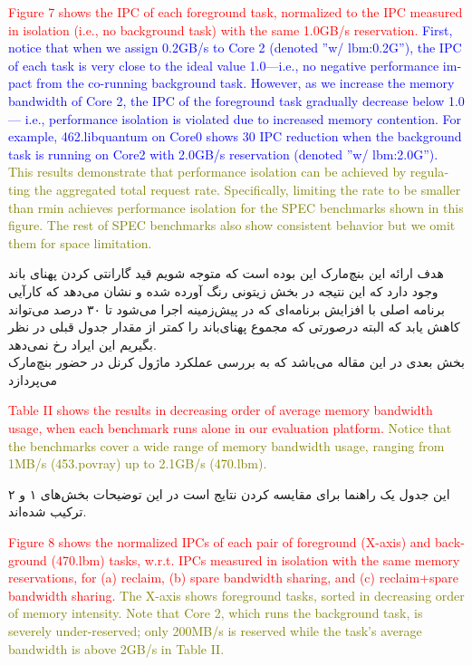 \documentclass[a4paper, 11pt]{article}
\begin{document}
\begin{latin}
\textcolor{red}{Figure 7 shows the IPC of each foreground task, normalized
to the IPC measured in isolation (i.e., no background task)
with the same 1.0GB/s reservation.}
\textcolor{blue}{First, notice that when we
assign 0.2GB/s to Core 2 (denoted ”w/ lbm:0.2G”), the IPC of
each task is very close to the ideal value 1.0—i.e., no negative
performance impact from the co-running background task.
However, as we increase the memory bandwidth of Core 2,
the IPC of the foreground task gradually decrease below 1.0—
i.e., performance isolation is violated due to increased memory
contention. For example, 462.libquantum on Core0 shows 30%
IPC reduction when the background task is running on Core2
with 2.0GB/s reservation (denoted ”w/ lbm:2.0G”).}
\textcolor{olive}{This results demonstrate that performance isolation can
be achieved by regulating the aggregated total request rate.
Specifically, limiting the rate to be smaller than rmin achieves
performance isolation for the SPEC benchmarks shown in this
figure. The rest of SPEC benchmarks also show consistent
behavior but we omit them for space limitation.}
\end{latin}
هدف ارائه این بنچ‌مارک این بوده است که متوجه شویم قید گارانتی کردن پهنای باند
وجود دارد که این نتیجه در بخش زیتونی رنگ آورده شده و نشان می‌دهد که کارآیی برنامه اصلی با افزایش برنامه‌ای
که در پیش‌زمینه اجرا می‌شود تا ۳۰ درصد می‌تواند کاهش یابد
که البته درصورتی که مجموع پهنای‌باند را کمتر از مقدار جدول قبلی در نظر بگیریم این ایراد رخ نمی‌دهد. \\
بخش بعدی در این مقاله
می‌باشد که به بررسی عملکرد ماژول کرنل در حضور بنچ‌مارک می‌پردازد
\begin{latin}
\textcolor{red}{Table II shows the results in decreasing order of average
memory bandwidth usage, when each benchmark runs alone
in our evaluation platform.}
\textcolor{olive}{Notice that the benchmarks cover a
wide range of memory bandwidth usage, ranging from 1MB/s
(453.povray) up to 2.1GB/s (470.lbm).}
\end{latin}
این جدول یک راهنما برای مقایسه کردن نتایج است در این توضیحات بخش‌های ۱ و ۲ ترکیب شده‌اند.
\begin{latin}
\textcolor{red}{Figure 8 shows the normalized IPCs of each pair of foreground (X-axis) and background (470.lbm) tasks, w.r.t. IPCs
measured in isolation with the same memory reservations, for
(a) reclaim, (b) spare bandwidth sharing, and (c) reclaim+spare
bandwidth sharing.}
\textcolor{olive}{ The X-axis shows foreground tasks, sorted
in decreasing order of memory intensity. Note that Core 2,
which runs the background task, is severely under-reserved;
only 200MB/s is reserved while the task’s average bandwidth
is above 2GB/s in Table II.}
\end{latin}
\end{document}
